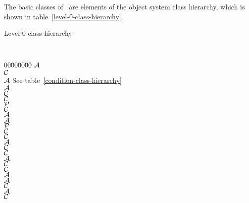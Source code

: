 \label{subsec:telos}
\label{subsec:objects}
%
\begin{optDefinition}
\noindent
The basic classes of \eulisp\ are elements of the object system class hierarchy,
which is shown in table~\ref{level-0-class-hierarchy}.
%
\begin{table}%
\caption{Level-0 class hierarchy}%
\label{level-0-class-hierarchy}%
{\tt%
\begin{tabbing}%
    00\=00\=00\=00\= \kill%
    $\cal A$  \\
    \>$\cal C$  \\
    \>$\cal A$ 
    {\normalfont See table~\ref{condition-class-hierarchy}} \\
    \>$\cal A$  \\
    \>\>$\cal C$  \\
    \>\>$\cal C$  \\
    \>\>$\cal P$  \\
    \>\>\>$\cal C$  \\
    \>$\cal A$  \\
    \>\>$\cal A$  \\
    \>\>\>$\cal P$  \\
    \>\>\>\>$\cal C$  \\
    \>\>\>\>$\cal C$ \\
    \>\>\>$\cal A$  \\
    \>\>\>\>$\cal C$  \\
    \>\>\>$\cal C$  \\
    \>\>$\cal A$  \\
    \>\>\>$\cal C$  \\
    \>$\cal C$  \\
    \>$\cal A$  \\
    \>\>$\cal A$ \\
    \>\>\>$\cal C$ \\
    \>\>$\cal A$ \\
    \>\>\>$\cal C$ \\

\end{tabbing}}
\end{table}
\end{optDefinition}
